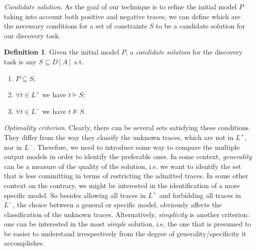 \documentclass[a4wide,11pt]{article}
\theoremstyle{definition}
\newtheorem{definition}{Definition}[section]
\theoremstyle{plain}
\newcommand\paragrafo[1]{{\smallskip \noindent \textit{#1}.}}
\begin{document}
\paragrafo{Candidate solution} As the goal of our technique is to refine the initial model $P$ taking into account both positive and negative traces, we can define which are the necessary conditions for a set of constraints $S$ to be a candidate solution for our discovery task.

\theoremstyle{definition}
\begin{definition}{}\label{def:cand}
Given the initial model $P$, a \emph{candidate solution} for the discovery task is any $S\subseteq D[A]$ s.t.
\begin{enumerate} [label=\textit{(\roman*)}]
  \item $P\subseteq S$;
  \item $\forall t\in L^+$ we have $t\models S$;
  \item $\forall t\in L^-$ we have $t\not\models S$.
\end{enumerate}
\end{definition}


\paragrafo{Optimality criterion} Clearly, there can be several sets satisfying these conditions. They differ from the way they classify the unknown traces, which are not in $L^+$, nor in $L^-$. Therefore, we need to introduce some way to compare the multiple output models in order to identify the preferable ones.
%
In some context, \emph{generality} can be a measure of the quality of the solution, i.e. we want to identify the set that is less committing in terms of restricting the admitted traces. In some other context on the contrary, we might be interested in the identification of a more specific model. So besides allowing all traces in $L^+$ and forbidding all traces in $L^-$, the choice between a general or specific model, obviously affects the classification of the unknown traces. Alternatively, \emph{simplicity} is another criterion: one can be interested in the most \emph{simple} solution, i.e. the one that is presumed to be easier to understand irrespectively from the degree of generality/specificity it accomplishes.
\end{document}
